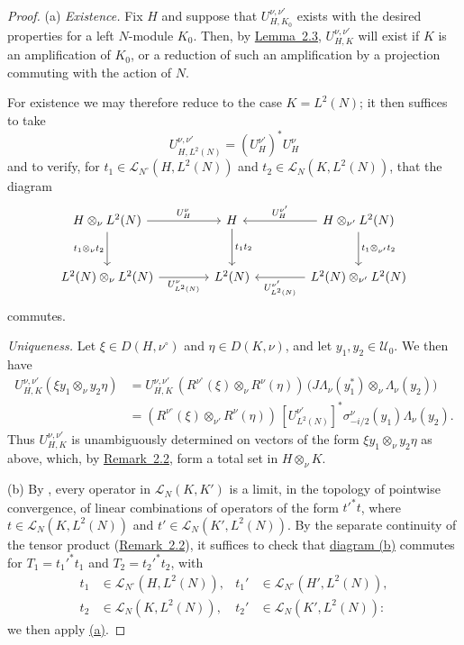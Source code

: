 \documentclass[fontsize=13pt,twoside,headings=small,bookmarkpackage=false]{scrartcl}
\newcommand{\Lop}{\mathcal L}
\begin{document}
\begin{proof}
(a) \emph{Existence.} Fix $H$ and suppose that $U_{H,K_0}^{\nu,\nu'}$ exists with the desired properties for a left $N$-module $K_0$. Then, by \hyperref[p:2.3]{Lemma~2.3}, $U_{H,K}^{\nu,\nu'}$ will exist if $K$ is an amplification of $K_0$, or a reduction of such an amplification by a projection commuting with the action of $N$.

For existence we may therefore reduce to the case $K=L^2(N)$; it then suffices to take
\[
U_{H,L^2(N)}^{\nu,\nu'}=(U_H^{\nu'})^*U_H^\nu
\]
and to verify, for $t_1\in\Lop_{N^\circ}(H,L^2(N))$ and $t_2\in\Lop_N(K,L^2(N))$, that the diagram
\[
\begin{tikzcd}[column sep=4em,row sep=large]
H\otimes_\nu L^2(N)\arrow[r,"U_H^\nu"]\arrow[d,"t_1\otimes_\nu t_2"']
&H\arrow[d,"t_1t_2"]
&H\otimes_{\nu'}L^2(N)\arrow[l,"U_H^{\nu'}"']\arrow[d,"t_1\otimes_{\nu'}t_2"]\\
L^2(N)\otimes_\nu L^2(N)\arrow[r,"U_{L^2(N)}^\nu"']
&L^2(N)
&L^2(N)\otimes_{\nu'}L^2(N)\arrow[l,"U_{L^2(N)}^{\nu'}"]
\end{tikzcd}
\]
commutes.

\emph{Uniqueness.} Let $\xi\in D(H,\nu^\circ)$ and $\eta\in D(K,\nu)$, and let $y_1,y_2\in\mathcal U_0$. We then have
\begin{align*}
U_{H,K}^{\nu,\nu'}(\xi y_1\otimes_\nu y_2\eta)
&=U_{H,K}^{\nu,\nu'}\,(R^{\nu^\circ}(\xi)\otimes_\nu R^\nu(\eta))\,
\bigl(J\Lambda_\nu(y_1^*)\otimes_\nu\Lambda_\nu(y_2)\bigr)\\
&=(R^{\nu^\circ}(\xi)\otimes_{\nu'}R^\nu(\eta))\,
[U_{L^2(N)}^{\nu'}]^*\sigma^\nu_{-i/2}(y_1)\Lambda_\nu(y_2).
\end{align*}
Thus $U_{H,K}^{\nu,\nu'}$ is unambiguously determined on vectors of the form $\xi y_1\otimes_\nu y_2\eta$ as above, which, by \hyperref[p:2.2]{Remark~2.2}, form a total set in $H\otimes_\nu K$.

(b) By \cite[Proposition~3(b)]{1}, every operator in $\Lop_N(K,K')$ is a limit, in the topology of pointwise convergence, of linear combinations of operators of the form $t'^*t$, where $t\in\Lop_N(K,L^2(N))$ and $t'\in\Lop_N(K',L^2(N))$. By the separate continuity of the tensor product (\hyperref[p:2.2]{Remark~2.2}), it suffices to check that \hyperlink{diagram:2.6b}{diagram (b)} commutes for $T_1=t_1'^*t_1$ and $T_2=t_2'^*t_2$, with
\begin{align*}
t_1&\in\Lop_{N^\circ}(H,L^2(N)),&
t_1'&\in\Lop_{N^\circ}(H',L^2(N)),\\
t_2&\in\Lop_N(K,L^2(N)),&
t_2'&\in\Lop_N(K',L^2(N)):
\end{align*}
we then apply \hyperlink{part:2.6a}{(a)}.
\end{proof}
\end{document}
